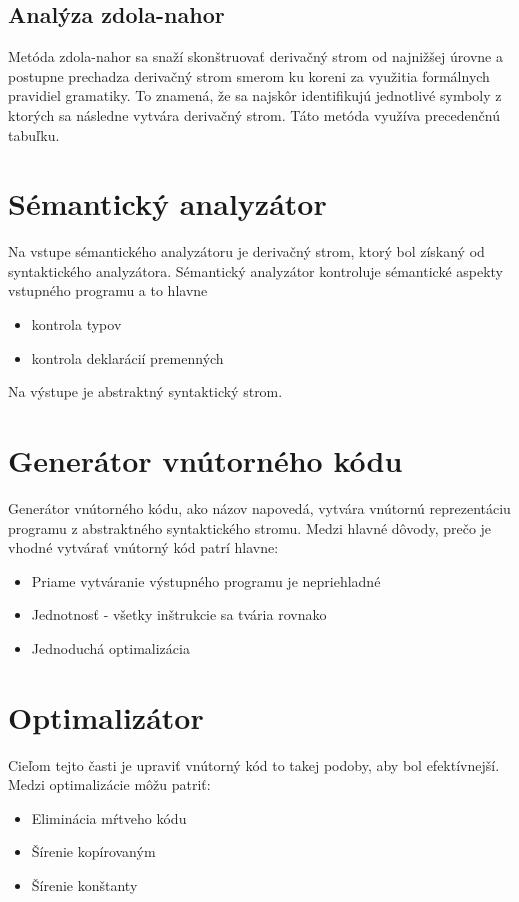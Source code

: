 \subsection{Analýza zdola-nahor}
Metóda zdola-nahor sa snaží skonštruovať derivačný strom od najnižšej úrovne a postupne prechadza derivačný strom smerom ku koreni za využitia formálnych pravidiel gramatiky. To znamená, že sa najskôr identifikujú jednotlivé symboly z ktorých sa následne vytvára derivačný strom. Táto metóda využíva precedenčnú tabuľku. \cite{aho}

\section{Sémantický analyzátor}
Na vstupe sémantického analyzátoru je derivačný strom, ktorý bol získaný od
syntaktického analyzátora. Sémantický analyzátor kontroluje sémantické aspekty
vstupného programu a to hlavne 
\begin{itemize}
    \item kontrola typov
    \item kontrola deklarácií premenných
\end{itemize}
Na výstupe je abstraktný syntaktický strom.

\section{Generátor vnútorného kódu}
Generátor vnútorného kódu, ako názov napovedá, vytvára vnútornú reprezentáciu programu
z abstraktného syntaktického stromu. Medzi hlavné dôvody, prečo je vhodné
vytvárať vnútorný kód patrí hlavne:
\begin{itemize}
    \item Priame vytváranie výstupného programu je nepriehladné
    \item Jednotnosť - všetky inštrukcie sa tvária rovnako
    \item Jednoduchá optimalizácia
\end{itemize}

\section{Optimalizátor}
Cieľom tejto časti je upraviť vnútorný kód to takej podoby, aby bol efektívnejší.
Medzi optimalizácie môžu patriť:
\begin{itemize}
    \item Eliminácia mŕtveho kódu
    \item Šírenie kopírovaným
    \item Šírenie konštanty
\end{itemize}

